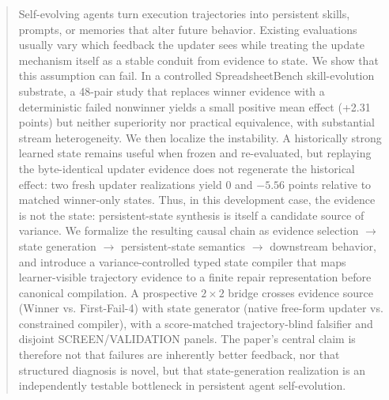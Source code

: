 \begin{abstract}
Self-evolving agents turn execution trajectories into persistent skills, prompts, or memories that alter future behavior. Existing evaluations usually vary which feedback the updater sees while treating the update mechanism itself as a stable conduit from evidence to state. We show that this assumption can fail. In a controlled SpreadsheetBench skill-evolution substrate, a 48-pair study that replaces winner evidence with a deterministic failed nonwinner yields a small positive mean effect (+2.31 points) but neither superiority nor practical equivalence, with substantial stream heterogeneity. We then localize the instability. A historically strong learned state remains useful when frozen and re-evaluated, but replaying the byte-identical updater evidence does not regenerate the historical effect: two fresh updater realizations yield 0 and $-5.56$ points relative to matched winner-only states. Thus, in this development case, the evidence is not the state: persistent-state synthesis is itself a candidate source of variance. We formalize the resulting causal chain as evidence selection $\rightarrow$ state generation $\rightarrow$ persistent-state semantics $\rightarrow$ downstream behavior, and introduce a variance-controlled typed state compiler that maps learner-visible trajectory evidence to a finite repair representation before canonical compilation. A prospective $2\times2$ bridge crosses evidence source (Winner vs. First-Fail-4) with state generator (native free-form updater vs. constrained compiler), with a score-matched trajectory-blind falsifier and disjoint SCREEN/VALIDATION panels. The paper's central claim is therefore not that failures are inherently better feedback, nor that structured diagnosis is novel, but that state-generation realization is an independently testable bottleneck in persistent agent self-evolution.
\end{abstract}
